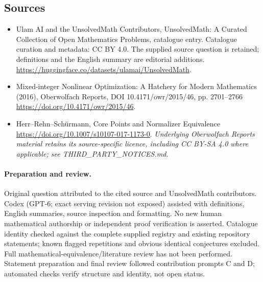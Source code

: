 \documentclass[11pt]{article}
\begin{document}
\subsection{Sources}
\begin{itemize}
\item[\hypertarget{source:statement:1}{S1}] Ulam AI and the UnsolvedMath Contributors, UnsolvedMath: A Curated Collection of Open Mathematics Problems, catalogue entry. Catalogue curation and metadata: CC BY 4.0. The supplied source question is retained; definitions and the English summary are editorial additions.
\url{https://huggingface.co/datasets/ulamai/UnsolvedMath}.
\item[\hypertarget{source:statement:2}{S2}] Mixed-integer Nonlinear Optimization: A Hatchery for Modern Mathematics (2016), Oberwolfach Reports, DOI 10.4171/owr/2015/46, pp. 2701--2766
\url{https://doi.org/10.4171/owr/2015/46}.
\item[\hypertarget{source:statement:3}{S3}] Herr--Rehn--Schürmann, Core Points and Normalizer Equivalence
\url{https://doi.org/10.1007/s10107-017-1173-0}.
\textit{Underlying Oberwolfach Reports material retains its source-specific licence, including CC BY-SA 4.0 where applicable; see THIRD\_PARTY\_NOTICES.md.}
\end{itemize}
\paragraph{Preparation and review.}
Original question attributed to the cited source and UnsolvedMath contributors. Codex (GPT-6; exact serving revision not exposed) assisted with definitions, English summaries, source inspection and formatting. No new human mathematical authorship or independent proof verification is asserted. Catalogue identity checked against the complete supplied registry and existing repository statements; known flagged repetitions and obvious identical conjectures excluded. Full mathematical-equivalence/literature review has not been performed. Statement preparation and final review followed contribution prompts C and D; automated checks verify structure and identity, not open status.
\label{end:statement}
\end{document}
